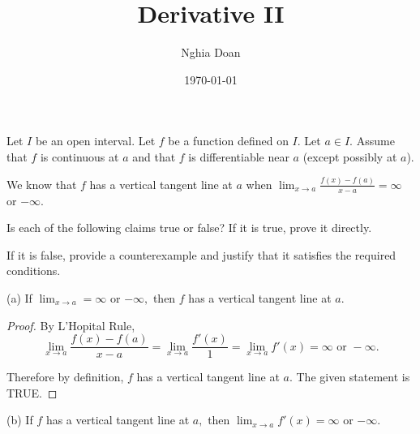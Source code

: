 \documentclass{article}
\title{Derivative II}
\author{Nghia Doan}
\date{\today}
\begin{document}
\maketitle

\begin{problem*}[1a]
    Let $I$ be an open interval. Let $f$ be a function defined on $I.$ Let $a \in I.$
    Assume that $f$ is continuous at $a$ and that $f$ is differentiable near $a$ (except possibly at $a$).
    
    We know that $f$ has a vertical tangent line at $a$ when $\lim_{x \rightarrow a} \frac{f(x) - f(a)}{x - a} = \infty$ or $-\infty.$
    
    Is each of the following claims true or false? If it is true, prove it directly.
    
    If it is false, provide a counterexample and justify that it satisfies the required conditions.

    (a) If $\lim_{x \rightarrow a} = \infty$ or $-\infty,$ then $f$ has a vertical tangent line at $a.$
\end{problem*}

\begin{proof}
    By L'Hopital Rule,
    \[
        \lim_{x \rightarrow a} \frac{f(x) - f(a)}{x - a} = \lim_{x \rightarrow a} \frac{f'(x)}{1} = \lim_{x \rightarrow a} f'(x) = \infty \text{\ or\ } -\infty. 
    \]

    Therefore by definition, $f$ has a vertical tangent line at $a.$ The given statement is TRUE.
\end{proof}

\newpage

\begin{problem*}[1b]
    (b) If $f$ has a vertical tangent line at $a,$ then $\lim_{x \rightarrow a} f'(x) = \infty$ or $-\infty.$
\end{problem*}
\end{document}
